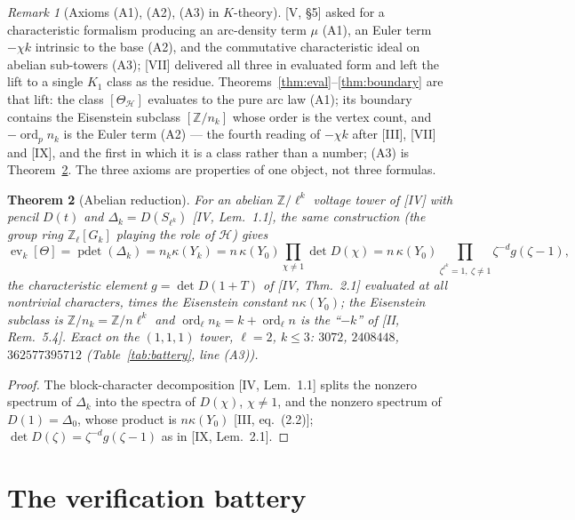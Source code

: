 \documentclass[11pt]{amsart}
\numberwithin{equation}{section}
\newtheorem{theorem}{Theorem}[section]
\theoremstyle{definition}
\theoremstyle{remark}
\newtheorem{remark}[theorem]{Remark}
\newcommand{\Z}{\mathbb{Z}}
\newcommand{\Zl}{\Z_\ell}
\newcommand{\cH}{\mathcal{H}}
\newcommand{\ord}{\operatorname{ord}}
\newcommand{\pdet}{\operatorname{pdet}}
\newcommand{\ev}{\operatorname{ev}}
\begin{document}
\begin{remark}[Axioms (A1), (A2), (A3) in $K$-theory]\label{rem:axioms}
[V, \S5] asked for a characteristic formalism producing an arc-density term $\mu$ (A1), an
Euler term $-\chi k$ intrinsic to the base (A2), and the commutative characteristic ideal on
abelian sub-towers (A3); [VII] delivered all three in evaluated form and left the lift to a
single $K_1$ class as the residue. Theorems~\ref{thm:eval}--\ref{thm:boundary} are that lift:
the class $[\Theta_{\cH}]$ evaluates to the pure arc law (A1); its boundary contains the
Eisenstein subclass $[\Z/n_k]$ whose order is the vertex count, and $-\ord_pn_k$ is the Euler
term (A2) --- the fourth reading of $-\chi k$ after [III], [VII] and [IX], and the first in
which it is a class rather than a number; (A3) is Theorem~\ref{thm:abelian}. The three
axioms are properties of one object, not three formulas.
\end{remark}

\begin{theorem}[Abelian reduction]\label{thm:abelian}
For an abelian $\Z/\ell^{k}$ voltage tower of {\rm[IV]} with pencil $D(t)$ and
$\Delta_k=D(S_{\ell^{k}})$ {\rm[IV, Lem.~1.1]}, the same construction (the group ring
$\Zl[G_k]$ playing the role of $\cH$) gives
\[
\ev_k[\Theta]=\pdet(\Delta_k)=n_k\kappa(Y_k)=n\,\kappa(Y_0)\prod_{\chi\ne1}\det D(\chi)
=n\,\kappa(Y_0)\prod_{\zeta^{\ell^{k}}=1,\ \zeta\ne1}\zeta^{-d}g(\zeta-1),
\]
the characteristic element $g=\det D(1+T)$ of {\rm[IV, Thm.~2.1]} evaluated at all
nontrivial characters, times the Eisenstein constant $n\kappa(Y_0)$; the Eisenstein
subclass is $\Z/n_k=\Z/n\ell^{k}$ and $\ord_\ell n_k=k+\ord_\ell n$ is the ``$-k$'' of
{\rm[II, Rem.~5.4]}. Exact on the $(1,1,1)$ tower, $\ell=2$, $k\le3$: $3072$, $2408448$,
$362577395712$ (Table~\ref{tab:battery}, line (A3)).
\end{theorem}

\begin{proof}
The block-character decomposition [IV, Lem.~1.1] splits the nonzero spectrum of
$\Delta_k$ into the spectra of $D(\chi)$, $\chi\ne1$, and the nonzero spectrum of
$D(1)=\Delta_0$, whose product is $n\kappa(Y_0)$ [III, eq.~(2.2)]; $\det D(\zeta)=\zeta^{-d}
g(\zeta-1)$ as in [IX, Lem.~2.1].
\end{proof}

\section{The verification battery}\label{sec:battery}
\end{document}
